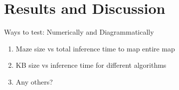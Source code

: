 





\chapter{Results and Discussion} 
\label{Results}

Ways to test: Numerically and Diagrammatically

\begin{enumerate}
\item Maze size vs total inference time to map entire map 
\item KB size vs inference time for different algorithms
\item Any others?
\end{enumerate}





